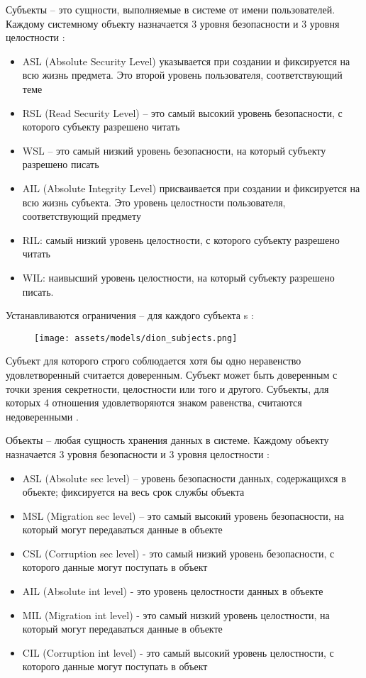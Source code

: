 Субъекты -- это сущности, выполняемые в системе от имени пользователей. Каждому системному объекту назначается 
3 уровня безопасности и 3 уровня целостности \autocite{Jalili2}:
\begin{itemize}
    \item ASL (Absolute Security Level) указывается при создании и фиксируется на всю жизнь предмета. Это второй уровень 
    пользователя, соответствующий теме
    \item RSL (Read Security Level) -- это самый высокий уровень безопасности, с которого субъекту разрешено читать
    \item WSL -- это самый низкий уровень безопасности, на который субъекту разрешено писать
    \item AIL (Absolute Integrity Level) присваивается при создании и фиксируется на всю жизнь субъекта. Это уровень 
    целостности пользователя, соответствующий предмету
    \item RIL: самый низкий уровень целостности, с которого субъекту разрешено читать
    \item WIL: наивысший уровень целостности, на который субъекту разрешено писать.
\end{itemize}

Устанавливаются ограничения -- для каждого субъекта s \autocite{Jalili2}:
\begin{figure}[H]
    \centering
    \texttt{[image: assets/models/dion\_subjects.png]}
\end{figure}

Субъект для которого строго соблюдается хотя бы одно неравенство удовлетворенный считается доверенным. Субъект может 
быть доверенным с точки зрения секретности, целостности или того и другого. Субъекты, для которых 4 отношения 
удовлетворяются знаком равенства, считаются недоверенными \autocite{Jalili2}.

Объекты -- любая сущность хранения данных в системе. Каждому объекту назначается 3 уровня безопасности и 
3 уровня целостности \autocite{Jalili2}:
\begin{itemize}
    \item ASL (Absolute sec level) -- уровень безопасности данных, содержащихся в объекте; фиксируется на весь срок 
    службы объекта
    \item MSL (Migration sec level) -- это самый высокий уровень безопасности, на который могут передаваться данные 
    в объекте
    \item CSL (Corruption sec level) - это самый низкий уровень безопасности, с которого данные могут поступать в объект
    \item AIL (Absolute int level) - это уровень целостности данных в объекте
    \item MIL (Migration int level) - это самый низкий уровень целостности, на который могут передаваться данные в объекте
    \item CIL (Corruption int level) - это самый высокий уровень целостности, с которого данные могут поступать в объект
\end{itemize}


